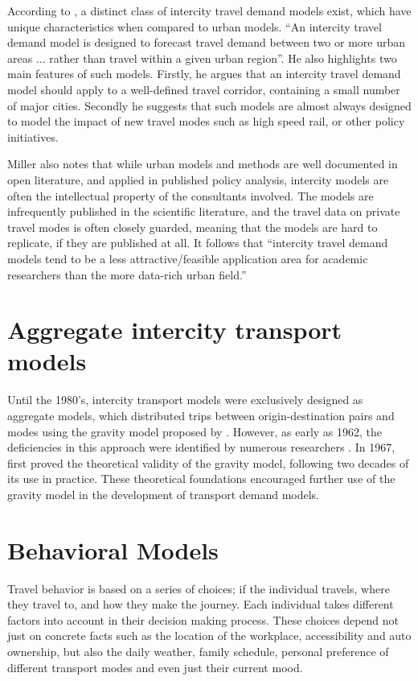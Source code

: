 According to \textcite{miller04}, a distinct class of intercity travel demand models exist, which have unique characteristics when compared to urban models. \enquote{An intercity travel demand model is designed to forecast travel demand between two or more urban areas ... rather than travel within a given urban region}. He also highlights two main features of such models. Firstly, he argues that an intercity travel demand model should apply to a well-defined travel corridor, containing a small number of major cities. Secondly he suggests that such models are almost always designed to model the impact of new travel modes such as high speed rail, or other policy initiatives.

Miller also notes that while urban models and methods are well documented in open literature, and applied in published policy analysis, intercity models are often the intellectual property of the consultants involved. The models are infrequently published in the scientific literature, and the travel data on private travel modes is often closely guarded, meaning that the models are hard to replicate, if they are published at all. It follows that \enquote{intercity travel demand models tend to be a less attractive/feasible application area for academic researchers than the more data-rich urban field.} \parencite{miller04}

\section{Aggregate intercity transport models}

Until the 1980’s, intercity transport models were exclusively designed as aggregate models, which distributed trips between origin-destination pairs and modes using the gravity model proposed by \textcite{casey55}. However, as early as 1962, the deficiencies in this approach were identified by numerous researchers \parencite{OiSchu62, Warner62}. In 1967, \textcite{Wilson67} first proved the theoretical validity of the gravity model, following two decades of its use in practice. These theoretical foundations encouraged further use of the gravity model in the development of transport demand models. 


\section{Behavioral Models}
Travel behavior is based on a series of choices; if the individual travels, where they travel to, and how they make the journey. Each individual takes different factors into account in their decision making process. These choices depend not just on concrete facts such as the location of the workplace, accessibility and auto ownership, but also the daily weather, family schedule, personal preference of different transport modes and even just their current mood.

